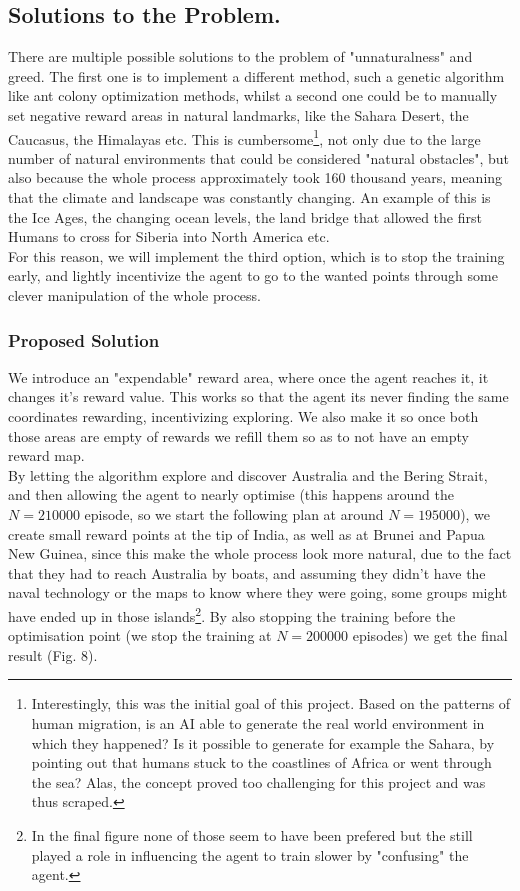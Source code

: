 \documentclass[11pt]{article}
\begin{document}
\begin{multicols}{2}
\subsection{Solutions to the Problem.}
There are multiple possible solutions to the problem of "unnaturalness" and greed. The first one is to implement a different method, such a genetic algorithm like ant colony optimization methods, whilst a second one could be to manually set negative reward areas in natural landmarks, like the Sahara Desert, the Caucasus, the Himalayas etc. This is cumbersome\footnote{Interestingly, this was the initial goal of this project. Based on the patterns of human migration, is an AI able to generate the real world environment in which they happened? Is it possible to generate for example the Sahara, by pointing out that humans stuck to the coastlines of Africa or went through the sea? Alas, the concept proved too challenging for this project and was thus scraped.}, not only due to the large number of natural environments that could be considered "natural obstacles", but also because the whole process approximately took 160 thousand years, meaning that the climate and landscape was constantly changing. An example of this is the Ice Ages, the changing ocean levels, the land bridge that allowed the first Humans to cross for Siberia into North America etc.\\
For this reason, we will implement the third option, which is to stop the training early, and lightly incentivize the agent to go to the wanted points through some clever manipulation of the whole process.\\

\subsubsection{Proposed Solution}
We introduce an "expendable" reward area, where once the agent reaches it, it changes it's reward value. This works so that the agent its never finding the same coordinates rewarding, incentivizing exploring. We also make it so once both those areas are empty of rewards we refill them so as to not have an empty reward map.\\
By letting the algorithm explore and discover Australia and the Bering Strait, and then allowing the agent to nearly optimise (this happens around the $N=210000$ episode, so we start the following plan at around $N=195000$), we create small reward points at the tip of India, as well as at Brunei and Papua New Guinea, since this make the whole process look more natural, due to the fact that they had to reach Australia by boats, and assuming they didn't have the naval technology or the maps to know where they were going, some groups might have ended up in those islands\footnote{In the final figure none of those seem to have been prefered but the still played a role in influencing the agent to train slower by "confusing" the agent.}. By also stopping the training before the optimisation point (we stop the training at $N=200000$ episodes) we get the final result (Fig. 8).
\end{multicols}
\end{document}
